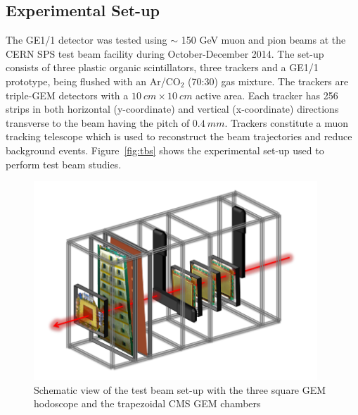 \subsection{Experimental Set-up}
The GE1/1 detector was tested using $\sim$ 150 GeV muon and pion beams at the CERN SPS test beam facility during October-December 2014. 
The set-up consists of three plastic organic scintillators, three trackers and a GE1/1 prototype, being flushed with an Ar/CO$_{2}$ (70:30) gas mixture. The trackers are triple-GEM detectors with a $10~cm\times10~cm$ active area. Each tracker has 256 strips in both horizontal (y-coordinate) and vertical (x-coordinate) directions transverse to the beam having the pitch of $0.4~mm$. Trackers constitute a muon tracking telescope which is used to reconstruct the beam trajectories and reduce background events. Figure~\ref{fig:tbs} shows the experimental set-up used to perform test beam studies.
\begin{figure}[!htbp]
    \begin{center}
        \includegraphics[width=0.95\textwidth]{figures/GEM/tbsetup.png}
        \caption{Schematic view of the test beam set-up with the three square GEM hodoscope and the trapezoidal CMS GEM chambers}
        \label{fig:tbsetup}
    \end{center}
\end{figure} 
